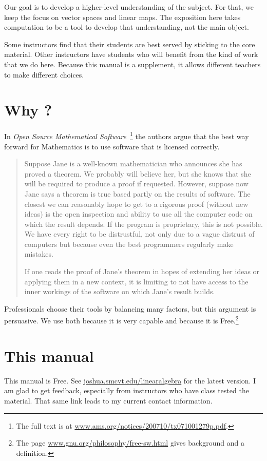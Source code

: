 Our goal is to develop a higher-level understanding of the subject. 
For that, we keep the focus on vector spaces and linear maps.
The exposition here takes computation to be
a tool to develop that understanding, not the main object.

Some instructors find that their students are best served by
sticking to the
core material.
Other instructors
have students who will benefit from the kind of work that
we do here.
Because this manual is a supplement, it allows different 
teachers to make different choices.


\section{Why \Sage?}
In 
\textit{Open Source Mathematical Software\,} 
\citep{JoynerStein07}\footnote{The full text is at
\protect\url{www.ams.org/notices/200710/tx071001279p.pdf}.}
the authors argue that the best way forward for Mathematics 
is to use software that is licensed correctly.

\begin{quotation}\small
Suppose Jane is a well-known mathematician who announces
she has proved a theorem. We probably will believe
her, but she knows that she will be required to produce
a proof if requested. However, suppose now Jane says a
theorem is true based partly on the results of software. The
closest we can reasonably hope to get to a rigorous proof
(without new ideas) is the open inspection and ability to use
all the computer code on which the result depends. If the
program is proprietary, this is not possible. We have every
right to be distrustful, not only due to a vague distrust of
computers but because even the best programmers regularly
make mistakes.

If one reads the proof of Jane’s theorem in hopes of
extending her ideas or applying them in a new context, it
is limiting to not have access to the inner workings of the
software on which Jane’s result builds.
\end{quotation}  
Professionals choose their tools by balancing many factors, but
this argument is persuasive.
We use \Sage{} both because it is very capable 
and because it is 
Free.\footnote{The page 
\protect\url{www.gnu.org/philosophy/free-sw.html} 
gives background and a definition.} 



\section{This manual}
This manual is Free.
See
\url{joshua.smcvt.edu/linearalgebra} for the latest version. 
I am glad to get feedback, especially from instructors
who have class tested the material.
That same link leads to my current contact information.

